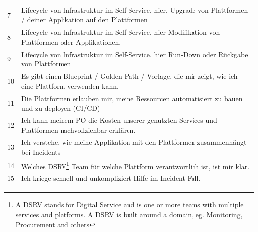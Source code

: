 \documentclass[a4paper,12pt]{article}
\begin{document}
\begin{table}[!htbp]
\begin{center}
\begin{tabularx}{\textwidth}{lX}
                7  & Lifecycle von Infrastruktur im Self-Service, hier, Upgrade von Plattformen / deiner Applikation auf den Plattformen                                                                                                                                         \\
                8  & Lifecycle von Infrastruktur im Self-Service, hier Modifikation von Plattformen oder Applikationen.                                                                                                                                                          \\
                9  & Lifecycle von Infrastruktur im Self-Service, hier Run-Down oder Rückgabe von Plattformen                                                                                                                                                                    \\
                10 & Es gibt einen Blueprint / Golden Path / Vorlage, die mir zeigt, wie ich eine Plattform verwenden kann.                                                                                                                                                      \\
                11 & Die Plattformen erlauben mir, meine Ressourcen automatisiert zu bauen und zu deployen (CI/CD)                                                                                                                                                               \\
                12 & Ich kann meinem PO die Kosten unserer genutzten Services und Plattformen nachvollziehbar erklären.                                                                                                                                                          \\
                13 & Ich verstehe, wie meine Applikation mit den Plattformen zusammenhängt bei Incidents                                                                                                                                                                         \\
                14 & Welches DSRV\footnote{A DSRV stands for Digital Service and is one or more teams with multiple services and platforms. A DSRV is built around a domain, eg. Monitoring, Procurement and others} Team für welche Plattform verantwortlich ist, ist mir klar. \\
                15 & Ich kriege schnell und unkompliziert Hilfe im Incident Fall.                                                                                                                                                                                                \\

\end{tabularx}
\end{center}
\end{table}
\end{document}
